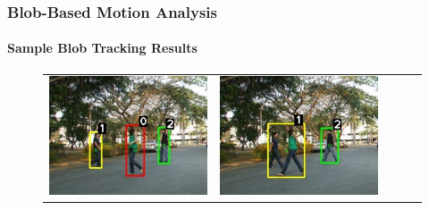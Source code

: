 
\begin{frame}
    \frametitle{Blob-Based Motion Analysis}
    \framesubtitle{Sample Blob Tracking Results}

    \begin{figure}
        \centering
        \begin{tabular}{ccccc}
            \includegraphics[scale=0.17]{figures/normal-tracking-result-0090} &
            \includegraphics[scale=0.17]{figures/normal-tracking-result-0094} &

\end{tabular}
\end{figure}
\end{frame}
